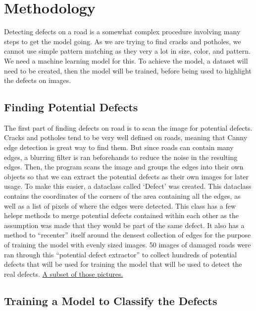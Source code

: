 \documentclass[12pt, letterpaper, twoside]{article}
\begin{document}
\section{Methodology}\label{sec:meth}

Detecting defects on a road is a somewhat complex procedure involving many steps to get the model going. 
As we are trying to find cracks and potholes, we cannot use simple pattern matching as they very a lot in size, color, and pattern.
We need a machine learning model for this.
To achieve the model, a dataset will need to be created, then the model will be trained, before being used to highlight the defects on images.

\subsection{Finding Potential Defects}\label{sec:meth:1}

The first part of finding defects on road is to scan the image for potential defects. 
Cracks and potholes tend to be very well defined on roads, meaning that Canny edge detection is great way to find them.
But since roads can contain many edges, a blurring filter is ran beforehands to reduce the noise in the resulting edges.
Then, the program scans the image and groups the edges into their own objects so that we can extract the potential defects as their own images for later usage.
To make this easier, a dataclass called `Defect' was created.
This dataclass contains the coordinates of the corners of the area containing all the edges, as well as a list of pixels of where the edges were detected.
This class has a few helepr methods to merge potential defects contained within each other as the assumption was made that they would be part of the same defect.
It also has a method to ``recenter'' itself around the densest collection of edges for the purpose of training the model with evenly sized images.
50 images of damaged roads were ran through this ``potential defect extractor'' to collect hundreds of potential defects that will be used for training the model that will be used to detect the real defects.
\hyperref[app:train_data]{A subset of those pictures.}

\subsection{Training a Model to Classify the Defects}
\end{document}

